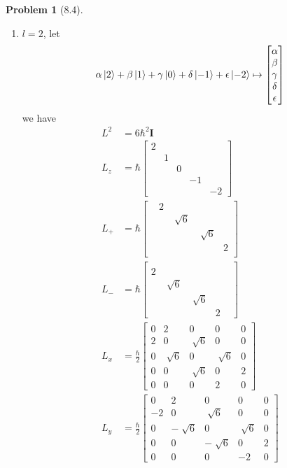 \documentclass[twoside,11pt]{article}
\theoremstyle{definition}
\newtheorem{problem}{Problem}
\theoremstyle{remark}
\begin{document}
\begin{problem}[8.4]
\begin{enumerate}[label=Case \arabic*., leftmargin=*]
\item $l=2$, let
\begin{align*}
    \alpha\ket{2} + \beta\ket{1} + \gamma\ket{0} + \delta\ket{-1} + \epsilon\ket{-2}
    \mapsto
    \begin{bmatrix}
        \alpha\\ \beta\\ \gamma\\ \delta\\ \epsilon
    \end{bmatrix}
\end{align*}
we have 
\begin{align*}
    L^2 &= 6\hbar^2 \mathbf{I}\\ 
    L_z &= \hbar\begin{bmatrix}
        2 & & & & \\
        & 1 & & & \\
        & & 0 & & \\
        & & & -1 & \\
        & & & & -2
    \end{bmatrix}\\
    L_+ &= \hbar\begin{bmatrix}
        & 2 & & & \\
        & & \sqrt[]{6} & & \\
        & & & \sqrt[]{6} & \\
        & & & & 2\\
        & & & & 
    \end{bmatrix}\\
    L_- &= \hbar\begin{bmatrix}
        & & & & \\
        2 & & & & \\
        & \sqrt[]{6} & & & \\
        & & \sqrt[]{6} & & \\
        & & & 2 & 
    \end{bmatrix}\\
    L_x &= \frac{\hbar}{2}\begin{bmatrix}
        0 & 2 & 0 & 0 & 0 \\
        2 & 0 & \sqrt[]{6} & 0 & 0 \\
        0 & \sqrt[]{6} & 0 & \sqrt[]{6} & 0\\
        0 & 0 & \sqrt[]{6} & 0 & 2\\
        0 & 0 & 0 & 2 & 0
    \end{bmatrix}\\
    L_y &= \frac{\hbar}{2}\begin{bmatrix}
        0 & 2 & 0 & 0 & 0 \\
        -2 & 0 & \sqrt[]{6} & 0 & 0 \\
        0 & -\sqrt[]{6} & 0 & \sqrt[]{6} & 0\\
        0 & 0 & -\sqrt[]{6} & 0 & 2\\
        0 & 0 & 0 & -2 & 0
    \end{bmatrix}
\end{align*}


\end{enumerate}
\end{problem}
\end{document}
